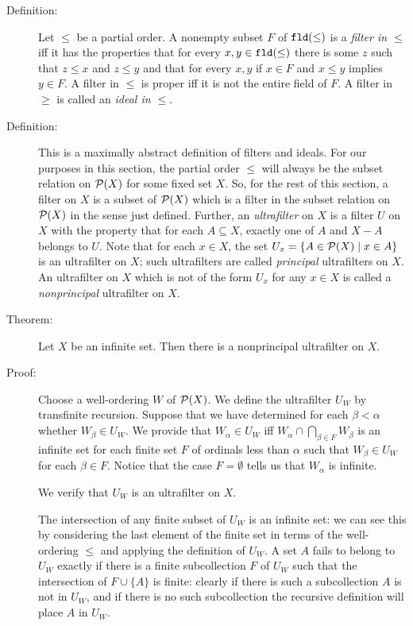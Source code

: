 \documentclass[12pt]{book}
\begin{document}
\begin{description}

\item[Definition:]  Let $\leq$ be a partial order.  A nonempty subset $F$ of ${\tt fld}(\leq)$  is a {\em filter in $\leq$\/}  iff it has the properties that for every $x,y \in {\tt fld}(\leq)$ there is some $z$ such that $z \leq x$ and $z \leq y$ and that for every $x,y$ if $x \in F$ and $x \leq y$ implies $y \in F$.  A filter in $\leq$ is proper iff it is not the entire field of $F$.  A filter in $\geq$ is called an {\em  ideal in $\leq$\/}.

\item[Definition:]  This is a maximally abstract definition of filters and ideals.  For our purposes in this section, the partial order $\leq$ will always be the subset
relation on ${\cal P}(X)$ for some fixed set $X$.  So, for the rest of this section, a filter on $X$ is a subset of ${\cal P}(X)$ which is a filter in the subset relation on ${\cal P}(X)$ in the sense just defined.  Further, an {\em ultrafilter\/} on $X$ is a filter $U$ on $X$ with the property that for each $A \subseteq X$,
exactly one of $A$ and $X-A$ belongs to $U$.  Note that for each $x \in X$, the set $U_x = \{A \in {\cal P}(X)\mid x \in A\}$ is an ultrafilter on $X$;
such ultrafilters are called {\em principal\/} ultrafilters on $X$.  An ultrafilter on $X$ which is not of the form $U_x$ for any $x \in X$ is called a {\em nonprincipal\/} ultrafilter on $X$.

\item[Theorem:]  Let $X$ be an infinite set.  Then there is a nonprincipal ultrafilter on $X$.

\item[Proof:]  Choose a well-ordering $W$ of ${\cal P}(X)$.  We define the ultrafilter $U_W$ by transfinite recursion.  Suppose that we have determined for each
$\beta<\alpha$ whether $W_{\beta} \in U_W$.  We provide that $W_{\alpha} \in U_W$ iff $W_{\alpha} \cap \bigcap_{\beta \in F}W_{\beta}$ is an infinite set for each finite set $F$ of ordinals less than $\alpha$ such that $W_{\beta} \in U_W$ for each $\beta \in F$.  Notice that the case $F=\emptyset$ tells us that $W_\alpha$ is infinite.

We verify that $U_W$ is an ultrafilter on $X$.

The intersection of any finite subset of $U_W$ is an infinite set:  we can see this by considering the last element of the finite set in terms of the well-ordering
$\leq$ and applying the definition of $U_W$.  A set $A$ fails to belong to $U_W$ exactly if there is a finite subcollection $F$ of $U_W$ such that
the intersection of $F \cup \{A\}$ is finite:  clearly if there is such a subcollection $A$ is not in $U_W$, and if there is no such subcollection the recursive definition will place $A$ in $U_W$.  


\end{description}
\end{document}
